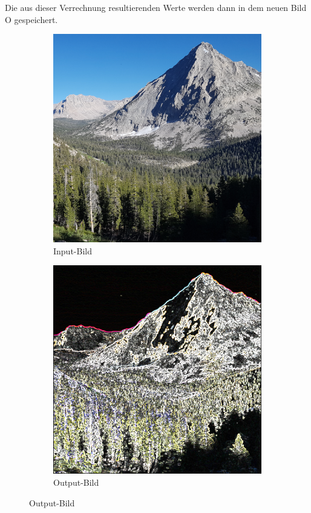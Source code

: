 \documentclass[course=erap]{aspdoc}
\begin{document}
Die aus dieser Verrechnung resultierenden Werte werden dann in dem neuen Bild O gespeichert.
\begin{figure}[H]
    \begin{subfigure}{.5\columnwidth}
        \centering
        \includegraphics[width=\columnwidth]{graphics/johnmuirtrail}
        \caption{Input-Bild}
        \label{fig:input-bild}
    \end{subfigure}
    \begin{subfigure}{.5\columnwidth}
        \centering
        \includegraphics[width=\columnwidth]{graphics/johnmuirtrail_sobel}
        \caption{Output-Bild}
        \label{fig:output-bild}
    \end{subfigure}
\end{figure}
\end{document}
